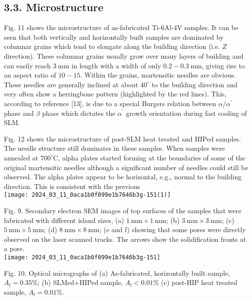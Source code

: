 \documentclass[10pt]{article}
\begin{document}
\subsection*{3.3. Microstructure}
Fig. 11 shows the microstructure of as-fabricated Ti-6Al-4V samples. It can be seen that both vertically and horizontally built samples are dominated by columnar grains which tend to elongate along the building direction (i.e. $Z$ direction). These columnar grains usually grow over many layers of building and can easily reach $3 \mathrm{~mm}$ in length with a width of only $0.2-0.3 \mathrm{~mm}$, giving rise to an aspect ratio of $10-15$. Within the grains, martensitic needles are obvious. These needles are generally inclined at about $40^{\circ}$ to the building direction and very often show a herringbone pattern (highlighted by the red lines). This, according to reference [13], is due to a special Burgers relation between $\alpha / \alpha^{\prime}$ phase and $\beta$ phase which dictates the $\alpha^{\prime}$ growth orientation during fast cooling of SLM.

Fig. 12 shows the microstructure of post-SLM heat treated and HIPed samples. The needle structure still dominates in these samples. When samples were annealed at $700^{\circ} \mathrm{C}$, alpha plates started forming at the boundaries of some of the original martensitic needles although a significant number of needles could still be observed. The alpha plates appear to be horizontal, e.g., normal to the building direction. This is consistent with the previous\\
\texttt{[image: 2024\_03\_11\_0aca1b0f099e1b7646b3g-151(1)]}

Fig. 9. Secondary electron SEM images of top surfaces of the samples that were fabricated with different island sizes, (a) $1 \mathrm{~mm} \times 1 \mathrm{~mm}$; (b) $3 \mathrm{~mm} \times 3 \mathrm{~mm}$; (c) $5 \mathrm{~mm} \times 5 \mathrm{~mm}$; (d) $8 \mathrm{~mm} \times 8 \mathrm{~mm}$; (e and f) showing that some pores were directly observed on the laser scanned tracks. The arrows show the solidification fronts at a pore.\\
\texttt{[image: 2024\_03\_11\_0aca1b0f099e1b7646b3g-151]}

Fig. 10. Optical micrographs of (a) As-fabricated, horizontally built sample, $A_{\mathrm{f}}=0.35 \%$; (b) SLMed+HIPed sample, $A_{\mathrm{f}}<0.01 \%$ (c) post-HIP heat treated sample, $A_{\mathrm{f}}=0.01 \%$.
\end{document}
